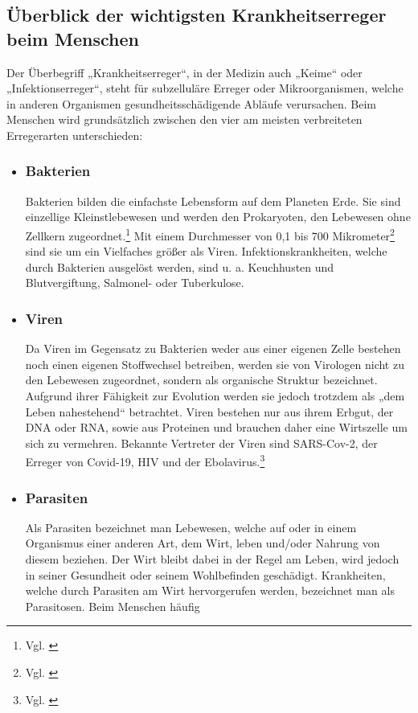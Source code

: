 \documentclass[12pt]{article}
\begin{document}
\subsection{Überblick der wichtigsten Krankheitserreger beim Menschen}
Der Überbegriff „Krankheitserreger“, in der Medizin auch „Keime“ oder „Infektionserreger“, steht für subzelluläre Erreger oder Mikroorganismen, welche in anderen Organismen gesundheitsschädigende Abläufe verursachen. Beim Menschen wird grundsätzlich zwischen den vier am meisten verbreiteten Erregerarten unterschieden:
\begin{itemize}
    \item \subsubsection{Bakterien}
    Bakterien bilden die einfachste Lebensform auf dem Planeten Erde. Sie sind einzellige Kleinstlebewesen und werden den Prokaryoten, den Lebewesen ohne Zellkern zugeordnet.\footnote{Vgl. \cite{Nagel2021}} Mit einem Durchmesser von 0,1 bis 700 Mikrometer\footnote{Vgl. \cite{BZgA2021}} sind sie um ein Vielfaches größer als Viren. Infektionskrankheiten, welche durch Bakterien ausgelöst werden, sind u. a. Keuchhusten und Blutvergiftung, Salmonel- oder Tuberkulose.
    \item \subsubsection{Viren}
    Da Viren im Gegensatz zu Bakterien weder aus einer eigenen Zelle bestehen noch einen eigenen Stoffwechsel betreiben, werden sie von Virologen nicht zu den Lebewesen zugeordnet, sondern als organische Struktur bezeichnet. Aufgrund ihrer Fähigkeit zur Evolution werden sie jedoch trotzdem als „dem Leben nahestehend“ betrachtet. Viren bestehen nur aus ihrem Erbgut, der DNA oder RNA, sowie aus Proteinen und brauchen daher eine Wirtszelle um sich zu vermehren. Bekannte Vertreter der Viren sind SARS-Cov-2, der Erreger von Covid-19, HIV und der Ebolavirus.\footnote{Vgl. \cite{Viren22}} 
    \item \subsubsection{Parasiten}
    Als Parasiten bezeichnet man Lebewesen, welche auf oder in einem Organismus einer anderen Art, dem Wirt, leben und/oder Nahrung von diesem beziehen. Der Wirt bleibt dabei in der Regel am Leben, wird jedoch in seiner Gesundheit oder seinem Wohlbefinden geschädigt. Krankheiten, welche durch Parasiten am Wirt hervorgerufen werden, bezeichnet man als Parasitosen. Beim Menschen häufig 

\end{itemize}
\end{document}
